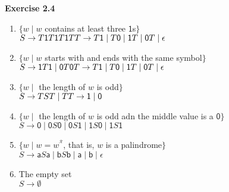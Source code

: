 \documentclass{article}
\makeatletter
\newcommand{\rev}{^{\scriptscriptstyle\mathcal{R}}}
\newcommand\exercise[1]{\par\vspace{4ex}\normalfont\normalsize\noindent
\textbf{\large Exercise #1}\par\nobreak\@afterindentfalse\@afterheading}
\makeatother
\begin{document}
\exercise{2.4}
\begin{enumerate}
	\item $\{w \mid w$ contains at least three $\textsf{1}$s$\}$ \\
	$S \rightarrow T\textsf{1}T\textsf{1}T\textsf{1}T \\ T \rightarrow T\textsf{1} \mid T\textsf{0} \mid \textsf{1}T \mid \textsf{0}T \mid \epsilon$
	\item $\{w \mid w$ starts with and ends with the same symbol$\}$ \\
	$S \rightarrow \textsf{1}T\textsf{1} \mid \textsf{0}T\textsf{0} \\ T \rightarrow T\textsf{1} \mid T\textsf{0} \mid \textsf{1}T \mid \textsf{0}T \mid \epsilon$
	\item $\{w \mid$ the length of $w$ is odd$\}$ \\
	$S \rightarrow TST \mid T \\ T \rightarrow \textsf{1} \mid \textsf{0}$
	\item $\{w \mid $ the length of $w$ is odd adn the middle value is a $\textsf{0}\}$ \\
	$S \rightarrow \textsf{0} \mid \textsf{0}S\textsf{0} \mid \textsf{0}S\textsf{1} \mid \textsf{1}S\textsf{0} \mid\textsf{1}S\textsf{1}$
	\item $\{w \mid w = w^{\rev}$, that is, $w$ is a palindrome$\}$\\
	$S \rightarrow \textsf{a}S\textsf{a} \mid \textsf{b}S\textsf{b} \mid \textsf{a} \mid \textsf{b} \mid \epsilon$
	\item The empty set \\
	$S \rightarrow \emptyset$
\end{enumerate}
\end{document}

